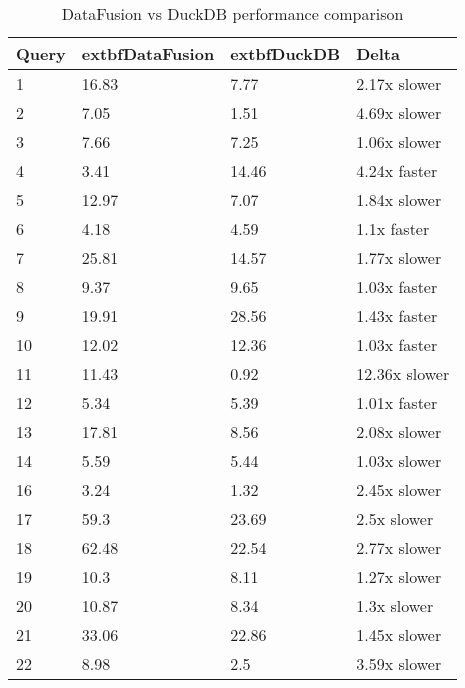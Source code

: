 \begin{table}[h]
\centering
\begin{tabular}{|l|l|l|l|}
\hline
Query & 	extbf{DataFusion} & 	extbf{DuckDB} & Delta \\
\hline
1 & 16.83 & 7.77 & 2.17x slower \\
\hline
2 & 7.05 & 1.51 & 4.69x slower \\
\hline
3 & 7.66 & 7.25 & 1.06x slower \\
\hline
4 & 3.41 & 14.46 & 4.24x faster \\
\hline
5 & 12.97 & 7.07 & 1.84x slower \\
\hline
6 & 4.18 & 4.59 & 1.1x faster \\
\hline
7 & 25.81 & 14.57 & 1.77x slower \\
\hline
8 & 9.37 & 9.65 & 1.03x faster \\
\hline
9 & 19.91 & 28.56 & 1.43x faster \\
\hline
10 & 12.02 & 12.36 & 1.03x faster \\
\hline
11 & 11.43 & 0.92 & 12.36x slower \\
\hline
12 & 5.34 & 5.39 & 1.01x faster \\
\hline
13 & 17.81 & 8.56 & 2.08x slower \\
\hline
14 & 5.59 & 5.44 & 1.03x slower \\
\hline
16 & 3.24 & 1.32 & 2.45x slower \\
\hline
17 & 59.3 & 23.69 & 2.5x slower \\
\hline
18 & 62.48 & 22.54 & 2.77x slower \\
\hline
19 & 10.3 & 8.11 & 1.27x slower \\
\hline
20 & 10.87 & 8.34 & 1.3x slower \\
\hline
21 & 33.06 & 22.86 & 1.45x slower \\
\hline
22 & 8.98 & 2.5 & 3.59x slower \\
\hline
\end{tabular}
\caption{DataFusion vs DuckDB performance comparison}
\label{table:1}
\end{table}